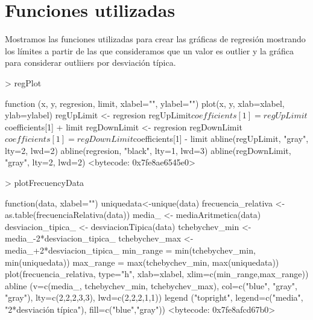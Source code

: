 \documentclass [a4paper] {article}
\begin{document}
\section{Funciones utilizadas}
Mostramos las funciones utilizadas para crear las gráficas de regresión mostrando los límites a partir de las que consideramos que un valor es outlier y la gráfica para considerar outliiers por desviación típica.
\begin{Schunk}
\begin{Sinput}
> regPlot
\end{Sinput}
\begin{Soutput}
function (x, y, regresion, limit, xlabel="", ylabel="") {
  plot(x, y, xlab=xlabel, ylab=ylabel)
  regUpLimit <- regresion
  regUpLimit$coefficients[1] = regUpLimit$coefficients[1] + limit
  regDownLimit <- regresion
  regDownLimit$coefficients[1] = regDownLimit$coefficients[1] - limit
  abline(regUpLimit, "gray", lty=2, lwd=2)
  abline(regresion, "black", lty=1, lwd=3)
  abline(regDownLimit, "gray", lty=2, lwd=2)
}
<bytecode: 0x7fe8ae6545e0>
\end{Soutput}
\begin{Sinput}
> plotFrecuencyData
\end{Sinput}
\begin{Soutput}
function(data, xlabel="") {
  uniquedata<-unique(data)
  frecuencia_relativa <- as.table(frecuenciaRelativa(data))
  media_ <- mediaAritmetica(data)
  desviacion_tipica_ <- desviacionTipica(data)
  tchebychev_min <- media_-2*desviacion_tipica_
  tchebychev_max <- media_+2*desviacion_tipica_
  min_range = min(tchebychev_min, min(uniquedata))
  max_range = max(tchebychev_min, max(uniquedata))
  plot(frecuencia_relativa, type="h", xlab=xlabel, xlim=c(min_range,max_range))
  abline (v=c(media_, tchebychev_min, tchebychev_max), 
          col=c("blue", "gray", "gray"), lty=c(2,2,2,3,3),
          lwd=c(2,2,2,1,1))
  legend ("topright", legend=c("media", "2*desviación típica"),
          fill=c("blue","gray"))
}
<bytecode: 0x7fe8afcd67b0>
\end{Soutput}
\end{Schunk}
\end{document}
